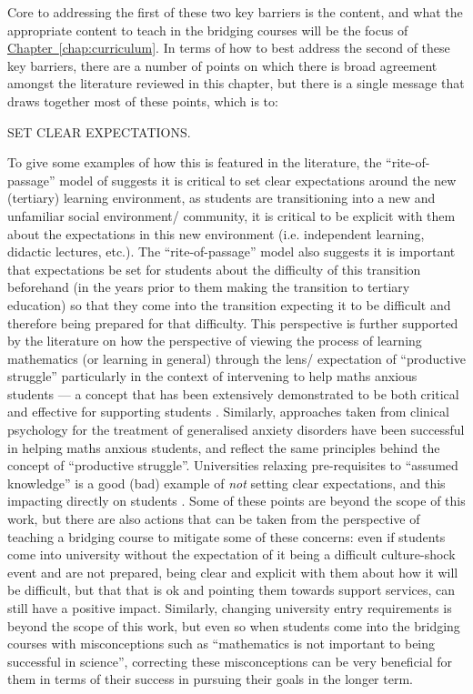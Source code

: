 \documentclass[twoside,12pt,a4paper]{report}
\newcommand{\refchap}[1]{\hyperref[chap:#1]{Chapter~\ref{chap:#1}}}
\begin{document}
Core to addressing the first of these two key barriers is the content, and what the appropriate content to teach in the bridging courses will be the focus of \refchap{curriculum}. In terms of how to best address the second of these key barriers, there are a number of points on which there is broad agreement amongst the literature reviewed in this chapter, but there is a single message that draws together most of these points, which is to:
\begin{center}
	{\large SET CLEAR EXPECTATIONS.}
\end{center}
To give some examples of how this is featured in the literature, the ``rite-of-passage'' model of  suggests it is critical to set clear expectations around the new (tertiary) learning environment, as students are transitioning into a new and unfamiliar social environment/ community, it is critical to be explicit with them about the expectations in this new environment (i.e. independent learning, didactic lectures, etc.). The ``rite-of-passage'' model also suggests it is important that expectations be set for students about the difficulty of this transition beforehand (in the years prior to them making the transition to tertiary education) so that they come into the transition expecting it to be difficult and therefore being prepared for that difficulty. This perspective is further supported by the literature on how the perspective of viewing the process of learning mathematics (or learning in general) through the lens/  expectation of ``productive struggle'' particularly in the context of intervening to help maths anxious students --- a concept that has been extensively demonstrated to be both critical and effective for supporting students \cite{Wang2015, Lin-Siegler2016, Hiebert2007, Carlson1999}.  Similarly, approaches taken from clinical psychology for the treatment of generalised anxiety disorders have been successful in helping maths anxious students, and reflect the same principles behind the concept of ``productive struggle''. Universities relaxing pre-requisites to ``assumed knowledge'' is a good (bad) example of \emph{not} setting clear expectations, and this impacting directly on students \cite{Gordon2015}. Some of these points are beyond the scope of this work, but there are also actions that can be taken from the perspective of teaching a bridging course to mitigate some of these concerns: even if students come into university without the expectation of it being a difficult culture-shock event and are not prepared, being clear and explicit with them about how it will be difficult, but that that is ok and pointing them towards support services, can still have a positive impact. Similarly, changing university entry requirements is beyond the scope of this work, but even so when students come into the bridging courses with misconceptions such as ``mathematics is not important to being successful in science'', correcting these misconceptions can be very beneficial for them in terms of their success in pursuing their goals in the longer term.
\end{document}
